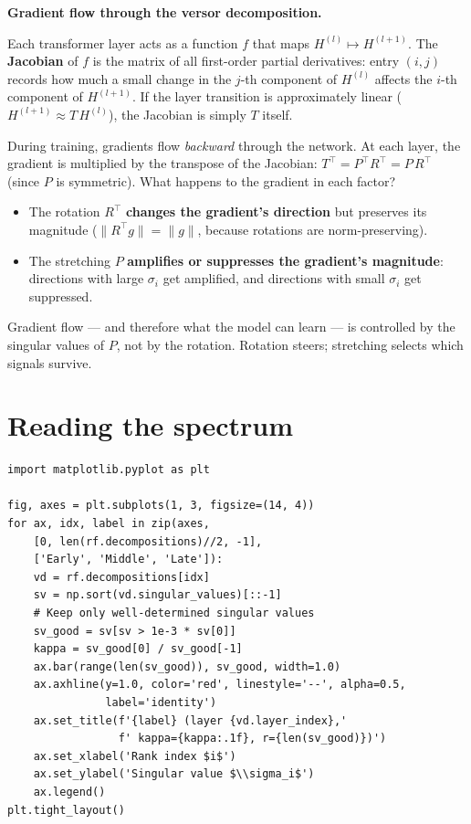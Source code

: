 \documentclass[11pt, twoside, openright]{memoir}
\numberwithin{equation}{chapter}
\begin{document}
\begin{mathbox}
\textbf{Gradient flow through the versor decomposition.}

Each transformer layer acts as a function $f$ that maps
$H^{(l)} \mapsto H^{(l+1)}$.  The \textbf{Jacobian} of $f$ is the
matrix of all first-order partial derivatives: entry $(i,j)$ records
how much a small change in the $j$-th component of $H^{(l)}$ affects
the $i$-th component of $H^{(l+1)}$.  If the layer transition is
approximately linear ($H^{(l+1)} \approx T\, H^{(l)}$), the Jacobian
is simply $T$ itself.

During training, gradients flow \emph{backward} through the network.
At each layer, the gradient is multiplied by the transpose of the
Jacobian: $T^\top = P^\top R^\top = P\,R^\top$ (since $P$ is
symmetric).  What happens to the gradient in each factor?

\begin{itemize}[nosep]
\item The rotation $R^\top$ \textbf{changes the gradient's direction}
  but preserves its magnitude ($\|R^\top g\| = \|g\|$, because
  rotations are norm-preserving).
\item The stretching $P$ \textbf{amplifies or suppresses the
  gradient's magnitude}: directions with large $\sigma_i$ get
  amplified, and directions with small $\sigma_i$ get suppressed.
\end{itemize}

Gradient flow --- and therefore what the model can learn --- is
controlled by the singular values of $P$, not by the rotation.
Rotation steers; stretching selects which signals survive.
\end{mathbox}

\section{Reading the spectrum}

\begin{lstlisting}[caption={Eigenvalue spectra (well-determined directions only)}]
import matplotlib.pyplot as plt

fig, axes = plt.subplots(1, 3, figsize=(14, 4))
for ax, idx, label in zip(axes,
    [0, len(rf.decompositions)//2, -1],
    ['Early', 'Middle', 'Late']):
    vd = rf.decompositions[idx]
    sv = np.sort(vd.singular_values)[::-1]
    # Keep only well-determined singular values
    sv_good = sv[sv > 1e-3 * sv[0]]
    kappa = sv_good[0] / sv_good[-1]
    ax.bar(range(len(sv_good)), sv_good, width=1.0)
    ax.axhline(y=1.0, color='red', linestyle='--', alpha=0.5,
               label='identity')
    ax.set_title(f'{label} (layer {vd.layer_index},'
                 f' kappa={kappa:.1f}, r={len(sv_good)})')
    ax.set_xlabel('Rank index $i$')
    ax.set_ylabel('Singular value $\\sigma_i$')
    ax.legend()
plt.tight_layout()
\end{lstlisting}
\end{document}
